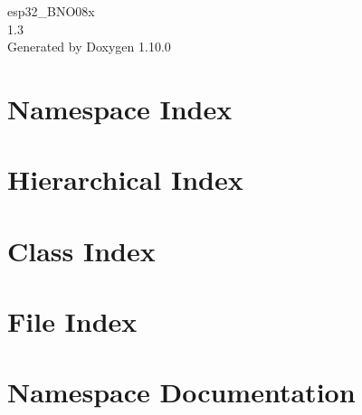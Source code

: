\documentclass[twoside]{book}
\newcommand{\+}{\discretionary{\mbox{\scriptsize$\hookleftarrow$}}{}{}}
\newcommand{\clearemptydoublepage}{%
    \newpage{\pagestyle{empty}\cleardoublepage}%
  }
\begin{document}
  \raggedbottom
    \hypersetup{pageanchor=false,
                bookmarksnumbered=true,
                pdfencoding=unicode
               }
  \begin{titlepage}
  \vspace*{7cm}
  \begin{center}%
  {\Large esp32\+\_\+\+BNO08x}\\
  [1ex]\large 1.\+3 \\
  \vspace*{1cm}
  {\large Generated by Doxygen 1.10.0}\\
  \end{center}
  \end{titlepage}
  \clearemptydoublepage
  \tableofcontents
  \clearemptydoublepage
  \hypersetup{pageanchor=true}

\chapter{Namespace Index}

\chapter{Hierarchical Index}

\chapter{Class Index}

\chapter{File Index}

\chapter{Namespace Documentation}

\end{document}

